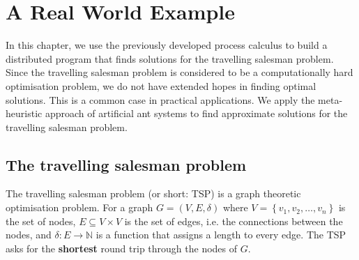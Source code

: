 \nomenclature[500]{\hfill}{}

\nomenclature[510]{\hfill}{}


\chapter{A Real World Example}
\vspace*{-0.5em}
In this chapter, we use the previously developed process calculus to build a distributed program that finds solutions for the travelling salesman problem. Since the travelling salesman problem is considered to be a computationally hard optimisation problem, we do not have extended hopes in finding optimal solutions. This is a common case in practical applications. We apply the meta-heuristic approach of artificial ant systems to find approximate solutions for the travelling salesman problem.

\section{The travelling salesman problem}
\label{chp:tsp}
\vspace*{-0.5em}
The travelling salesman problem (or short: \textsc{TSP}) is a graph theoretic optimisation problem. For a graph $G = \left( V, E, \delta \right)$ where $V = \left\{ v_1, v_2, \ldots, v_n \right\}$ is the set of nodes, $E \subseteq V \times V$ is the set of edges, i.e. the connections between the nodes, and $\delta \colon E \to \mathbb{N}$ is a function that assigns a length to every edge. The \textsc{TSP} asks for the \textbf{shortest} round trip through the nodes of $G$.



